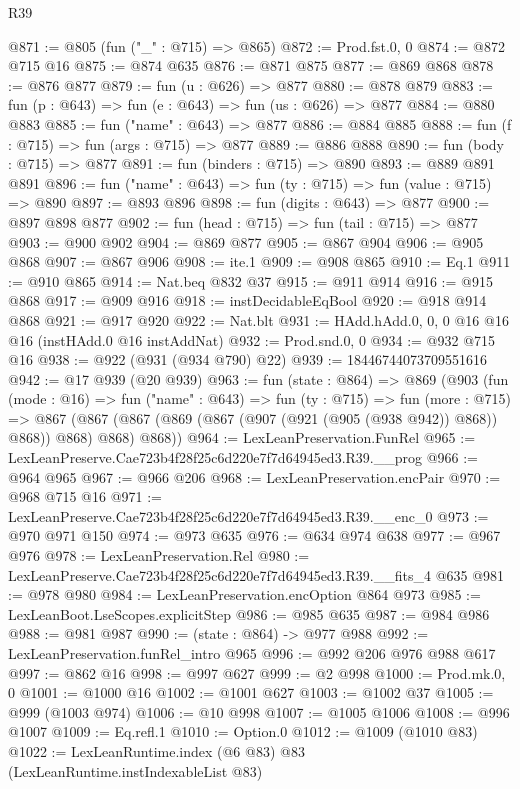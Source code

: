 \begin{lexlean}{R39}
\begin{coremodule}
@871 := @805 (fun ("_" : @715) => @865)
@872 := Prod.fst.{0, 0}
@874 := @872 @715 @16
@875 := @874 @635
@876 := @871 @875
@877 := @869 @868
@878 := @876 @877
@879 := fun (u : @626) => @877
@880 := @878 @879
@883 := fun (p : @643) => fun (e : @643) => fun (us : @626) => @877
@884 := @880 @883
@885 := fun ("name" : @643) => @877
@886 := @884 @885
@888 := fun (f : @715) => fun (args : @715) => @877
@889 := @886 @888
@890 := fun (body : @715) => @877
@891 := fun (binders : @715) => @890
@893 := @889 @891 @891
@896 := fun ("name" : @643) => fun (ty : @715) => fun (value : @715) => @890
@897 := @893 @896
@898 := fun (digits : @643) => @877
@900 := @897 @898 @877
@902 := fun (head : @715) => fun (tail : @715) => @877
@903 := @900 @902
@904 := @869 @877
@905 := @867 @904
@906 := @905 @868
@907 := @867 @906
@908 := ite.{1}
@909 := @908 @865
@910 := Eq.{1}
@911 := @910 @865
@914 := Nat.beq @832 @37
@915 := @911 @914
@916 := @915 @868
@917 := @909 @916
@918 := instDecidableEqBool
@920 := @918 @914 @868
@921 := @917 @920
@922 := Nat.blt
@931 := HAdd.hAdd.{0, 0, 0} @16 @16 @16 (instHAdd.{0} @16 instAddNat)
@932 := Prod.snd.{0, 0}
@934 := @932 @715 @16
@938 := @922 (@931 (@934 @790) @22)
@939 := 18446744073709551616
@942 := @17 @939 (@20 @939)
@963 := fun (state : @864) =>
  @869
    (@903
      (fun (mode : @16) =>
      fun ("name" : @643) =>
      fun (ty : @715) =>
      fun (more : @715) =>
      @867 (@867 (@867 (@869 (@867 (@907 (@921 (@905 (@938 @942)) @868)) @868)) @868) @868) @868))
@964 := LexLeanPreservation.FunRel
@965 := LexLeanPreserve.Cae723b4f28f25c6d220e7f7d64945ed3.R39.__prog
@966 := @964 @965
@967 := @966 @206
@968 := LexLeanPreservation.encPair
@970 := @968 @715 @16
@971 := LexLeanPreserve.Cae723b4f28f25c6d220e7f7d64945ed3.R39.__enc_0
@973 := @970 @971 @150
@974 := @973 @635
@976 := @634 @974 @638
@977 := @967 @976
@978 := LexLeanPreservation.Rel
@980 := LexLeanPreserve.Cae723b4f28f25c6d220e7f7d64945ed3.R39.__fits_4 @635
@981 := @978 @980
@984 := LexLeanPreservation.encOption @864 @973
@985 := LexLeanBoot.LseScopes.explicitStep
@986 := @985 @635
@987 := @984 @986
@988 := @981 @987
@990 := (state : @864) -> @977 @988
@992 := LexLeanPreservation.funRel_intro @965
@996 := @992 @206 @976 @988 @617
@997 := @862 @16
@998 := @997 @627
@999 := @2 @998
@1000 := Prod.mk.{0, 0}
@1001 := @1000 @16
@1002 := @1001 @627
@1003 := @1002 @37
@1005 := @999 (@1003 @974)
@1006 := @10 @998
@1007 := @1005 @1006
@1008 := @996 @1007
@1009 := Eq.refl.{1}
@1010 := Option.{0}
@1012 := @1009 (@1010 @83)
@1022 := LexLeanRuntime.index
    (@6 @83)
    @83
    (LexLeanRuntime.instIndexableList @83)

\end{coremodule}
\end{lexlean}
